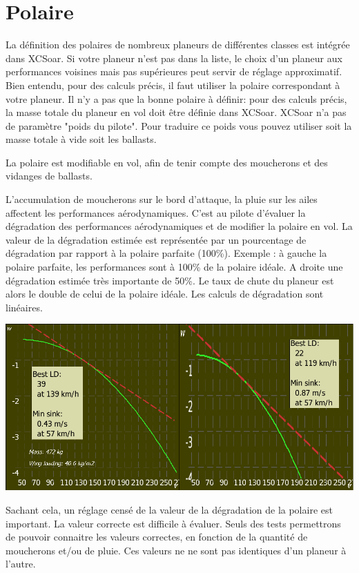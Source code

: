 \section{Polaire}
La définition des polaires de nombreux planeurs de différentes classes est intégrée dans XCSoar. Si votre planeur n'est pas dans la liste, le choix d'un planeur aux performances voisines mais pas supérieures peut servir de réglage approximatif. Bien entendu, pour des calculs précis, il faut utiliser la polaire correspondant à votre planeur. Il n'y a pas que la bonne polaire à définir: pour des calculs précis, la masse totale du planeur en vol doit être définie dans XCSoar. XCSoar n'a pas de paramètre "poids du pilote". Pour traduire ce poids vous pouvez utiliser soit la masse totale à vide soit les ballasts.

La polaire est modifiable en vol, afin de tenir compte des moucherons et des vidanges de ballasts.

L'accumulation de moucherons sur le bord d'attaque, la pluie sur les ailes affectent les performances aérodynamiques. C'est au pilote d'évaluer la dégradation des performances aérodynamiques et de modifier la polaire en vol. La valeur de la dégradation estimée est représentée par un pourcentage de dégradation par rapport à la polaire parfaite (100\%). Exemple : à gauche la polaire parfaite, les performances sont à 100\% de la polaire idéale. A droite une dégradation estimée très importante de 50\%. Le taux de chute du planeur est alors le double de celui de la polaire idéale. Les calculs de dégradation sont linéaires. 

\begin{center}
\includegraphics[angle=0,width=\linewidth,keepaspectratio='true']{figures/cut-clean-dirty-polar.png}
\end{center}
Sachant cela, un réglage censé de la valeur de la dégradation de la polaire est important. La valeur correcte est difficile à évaluer. Seuls des tests permettrons de pouvoir connaitre les valeurs correctes, en fonction de la quantité de moucherons et/ou de pluie. Ces valeurs ne ne sont pas identiques d'un planeur à l'autre. 

